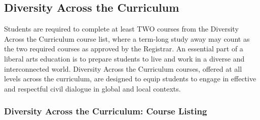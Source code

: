 \documentclass[
  letterpaper,
]{scrbook}
\begin{document}
\subsection{Diversity Across the
Curriculum}\label{diversity-across-the-curriculum}

Students are required to complete at least TWO courses from the
Diversity Across the Curriculum course list, where a term-long study
away may count as the two required courses as approved by the Registrar.
An essential part of a liberal arts education is to prepare students to
live and work in a diverse and interconnected world. Diversity Across
the Curriculum courses, offered at all levels across the curriculum, are
designed to equip students to engage in effective and respectful civil
dialogue in global and local contexts.

\subsubsection{Diversity Across the Curriculum: Course
Listing}\label{diversity-across-the-curriculum-course-listing}
\end{document}
